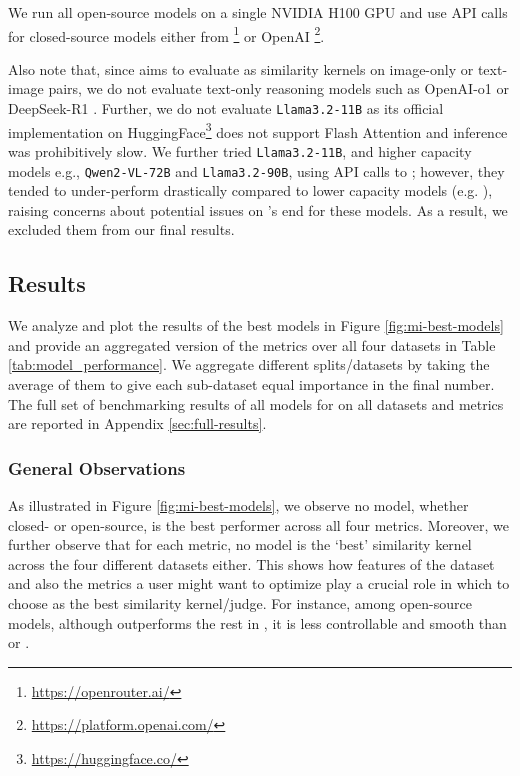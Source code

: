 We run all open-source models on a single NVIDIA H100 GPU and use API calls for closed-source models either from \openrouter\footnote{\url{https://openrouter.ai/}} or OpenAI \footnote{\url{https://platform.openai.com/}}.

Also note that, since \mmscore{} aims to evaluate \modelss{} as similarity kernels on image-only or text-image pairs, we do not evaluate text-only reasoning models such as OpenAI-o1 or DeepSeek-R1 \cite{guo2025deepseek}. Further, we do not evaluate \texttt{Llama3.2-11B} \cite{llama3} as its official implementation on HuggingFace\footnote{\url{https://huggingface.co/}} does not support Flash Attention \cite{dao2022flashattention} and inference was prohibitively slow. We further tried \texttt{Llama3.2-11B}, and higher capacity models e.g., \texttt{Qwen2-VL-72B} and \texttt{Llama3.2-90B}, using API calls to \openrouter; however, they tended to under-perform drastically compared to lower capacity models (e.g. \qwenTwoVLTwoB{}), raising concerns about potential issues on \openrouter's end for these models. As a result, we excluded them from our final results.





\subsection{Results}
\vspace{-1mm}
We analyze and plot the results of the best models in Figure \ref{fig:mi-best-models} and provide an aggregated version of the metrics over all four datasets in Table \ref{tab:model_performance}. We aggregate different splits/datasets by taking the average of them to give each sub-dataset equal importance in the final number. The full set of benchmarking results of all models for \mmscore{} on all datasets and metrics are reported in Appendix \ref{sec:full-results}.

\vspace{-2mm}
\subsubsection{General Observations}
As illustrated in Figure \ref{fig:mi-best-models}, we observe no model, whether closed- or open-source, is the best performer across all four metrics. Moreover, we further observe that for each metric, no model is the `best' similarity kernel across the four different datasets either. This shows how features of the dataset and also the metrics a user might want to optimize play a crucial role in which \model{} to choose as the best similarity kernel/judge. For instance, among open-source models, although \internvlTwoFiveEightB{} outperforms the rest in \nmi, it is less controllable and smooth than \qwenTwoVLSevenB{} or \llavaonevision{}.

